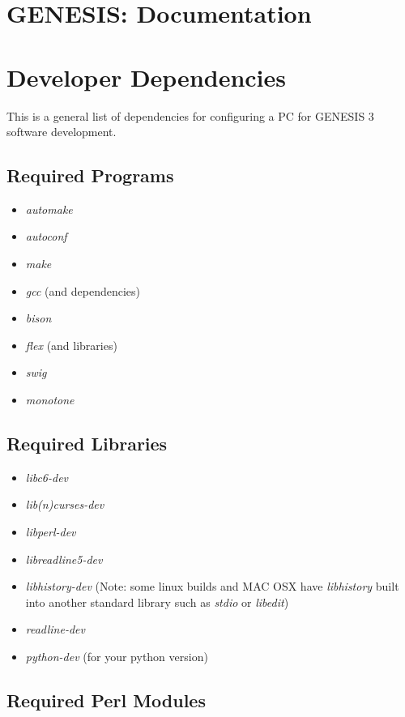 \documentclass[12pt]{article}
\begin{document}
\section*{GENESIS: Documentation}

\section*{Developer Dependencies}

This is a general list of dependencies for configuring a PC for
GENESIS 3 software development.

\subsection*{Required Programs}

\begin{itemize}
   \item {\it automake}
   \item {\it autoconf}
   \item {\it make}
   \item {\it gcc} (and dependencies)
   \item {\it bison}
   \item {\it flex} (and libraries)
   \item {\it swig}
   \item {\it monotone}
\end{itemize} 

\subsection*{Required Libraries}

\begin{itemize}
   \item {\it libc6-dev}
   \item {\it lib(n)curses-dev}
   \item {\it libperl-dev}
   \item {\it libreadline5-dev}
   \item {\it libhistory-dev} (Note: some linux builds and MAC OSX have {\it libhistory} built into another standard library such as {\it stdio} or {\it libedit})
   \item {\it readline-dev}
   \item {\it python-dev} (for your python version) 
\end{itemize} 

\subsection*{Required Perl Modules}
\end{document}
